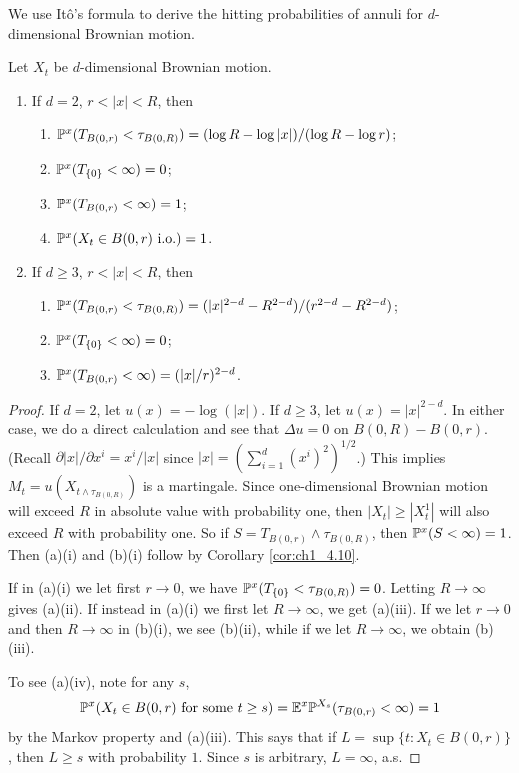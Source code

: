 We use It\^o's formula to derive the hitting probabilities of annuli for $d$-dimensional Brownian motion.

\begin{proposition}\label{prop:ch1_5.8}
Let $X_t$ be $d$-dimensional Brownian motion.
\begin{enumerate}[topsep=0.2\baselineskip]
    \item If $d = 2$, $r < |x| < R$, then
    \begin{enumerate}[align=right, leftmargin=2.7em, label=(\roman*)]
        \setlength{\itemindent}{-1.5em}
        \item $\P^x(T_{B(0,r)} < \tau_{B(0,R)}) = (\log R - \log |x|)/(\log R - \log r)$;
        \item $\P^x(T_{\{0\}} < \infty) = 0$;
        \item $\P^x(T_{B(0,r)} < \infty) = 1$;
        \item $\P^x(X_t \in B(0,r)~\textnormal{i.o.}) = 1$.
    \end{enumerate}

    \item If $d \geq 3$, $r < |x| < R$, then
    \begin{enumerate}[align=right, leftmargin=2.7em, label=(\roman*)]
        \setlength{\itemindent}{-1.5em}
        \item $\P^x(T_{B(0,r)} < \tau_{B(0,R)}) = (|x|^{2-d} - R^{2-d})/(r^{2-d} - R^{2-d})$;\
        \item $\P^x(T_{\{0\}} < \infty) = 0$;
        \item $\P^x(T_{B(0,r)} < \infty) = (|x|/r)^{2-d}$.
    \end{enumerate}
\end{enumerate}
\end{proposition}

\begin{proof}
If $d = 2$, let $u(x) = -\log(|x|)$. If $d \geq 3$, let $u(x) = |x|^{2-d}$. In either case, we do a direct calculation and see that $\Delta u = 0$ on $B(0,R) - B(0,r)$. (Recall $\partial|x|/\partial x^i = x^i/|x|$ since $|x| = (\sum_{i=1}^d(x^i)^2)^{1/2}$.) This implies $M_t = u(X_{t\wedge\tau_{B(0,R)}})$ is a martingale. Since one-dimensional Brownian motion will exceed $R$ in absolute value with probability one, then $|X_t| \geq |X_t^1|$ will also exceed $R$ with probability one. So if $S = T_{B(0,r)} \wedge \tau_{B(0,R)}$, then $\P^x(S < \infty) = 1$. Then (a)(i) and (b)(i) follow by Corollary \ref{cor:ch1_4.10}.

If in (a)(i) we let first $r \to 0$, we have $\P^x(T_{\{0\}} < \tau_{B(0,R)}) = 0$. Letting $R \to \infty$ gives (a)(ii). If instead in (a)(i) we first let $R \to \infty$, we get (a)(iii). If we let $r\to 0$ and then $R\to\infty$ in (b)(i), we see (b)(ii), while if we let $R\to\infty$, we obtain (b)(iii).

To see (a)(iv), note for any $s$,
\[
    \P^x(X_t \in B(0,r)~\text{for some}~t \geq s) = \E^x \P^{X_s}(\tau_{B(0,r)} < \infty) = 1
\]
by the Markov property and (a)(iii). This says that if $L = \sup\{t : X_t \in B(0,r)\}$, then $L \geq s$ with probability $1$. Since $s$ is arbitrary, $L = \infty$, a.s.
\end{proof}

